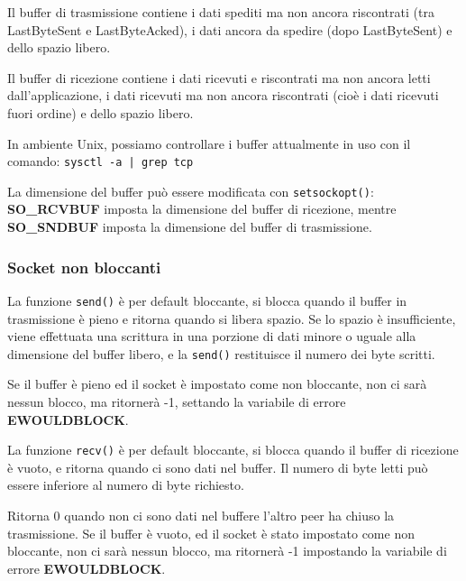             Il buffer di trasmissione contiene i dati spediti ma non ancora riscontrati (tra LastByteSent e LastByteAcked), i dati ancora da spedire (dopo LastByteSent) e dello spazio libero.
        
            Il buffer di ricezione contiene i dati ricevuti e riscontrati ma non ancora letti dall'applicazione, i dati ricevuti ma non ancora riscontrati (cioè i dati ricevuti fuori ordine) e dello spazio libero.
        
            In ambiente Unix, possiamo controllare i buffer attualmente in uso con il comando: \verb:sysctl -a | grep tcp:

            La dimensione del buffer può essere modificata con \verb:setsockopt():: \textbf{SO\_RC\-VBUF} imposta la dimensione del buffer di ricezione, mentre \textbf{SO\_SNDBUF} imposta la dimensione del buffer di trasmissione.

        \subsubsection{Socket non bloccanti}
            La funzione \verb:send(): è per default bloccante, si blocca quando il buffer in trasmissione è pieno e ritorna quando si libera spazio. Se lo spazio è insufficiente, viene effettuata una scrittura in una porzione di dati minore o uguale alla dimensione del buffer libero, e la \verb:send(): restituisce il numero dei byte scritti.
        
            Se il buffer è pieno ed il socket è impostato come non bloccante, non ci sarà nessun blocco, ma ritornerà -1, settando la variabile di errore \textbf{EWOULDBLOCK}.
        
            La funzione \verb:recv(): è per default bloccante, si blocca quando il buffer di ricezione è vuoto, e ritorna quando ci sono dati nel buffer. Il numero di byte letti può essere inferiore al numero di byte richiesto.
        
            Ritorna 0 quando non ci sono dati nel buffere l'altro peer ha chiuso la trasmissione. Se il buffer è vuoto, ed il socket è stato impostato come non bloccante, non ci sarà nessun blocco, ma ritornerà -1 impostando la variabile di errore \textbf{EWOULDBLOCK}.


